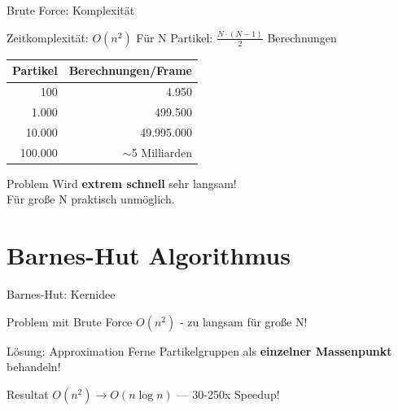 \documentclass[xcolor=dvipsnames]{beamer}
\begin{document}
\begin{frame}{Brute Force: Komplexität}
\begin{block}{Zeitkomplexität: $O(n^2)$}
Für N Partikel: $\frac{N \cdot (N-1)}{2}$ Berechnungen
\end{block}

\begin{table}
\centering
\begin{tabular}{r|r}
\textbf{Partikel} & \textbf{Berechnungen/Frame} \\ \hline
100 & 4.950 \\
1.000 & 499.500 \\
10.000 & 49.995.000 \\
100.000 & $\sim$5 Milliarden
\end{tabular}
\end{table}

\begin{alertblock}{Problem}
Wird \textbf{extrem schnell} sehr langsam! \\
Für große N praktisch unmöglich.
\end{alertblock}
\end{frame}

\section{Barnes-Hut Algorithmus}

\begin{frame}{Barnes-Hut: Kernidee}
\begin{block}{Problem mit Brute Force}
$O(n^2)$ - zu langsam für große N!
\end{block}

\begin{block}{Lösung: Approximation}
Ferne Partikelgruppen als \textbf{einzelner Massenpunkt} behandeln!
\end{block}

\begin{center}
\end{center}

\begin{exampleblock}{Resultat}
$O(n^2) \rightarrow O(n \log n)$ --- 30-250x Speedup!
\end{exampleblock}
\end{frame}
\end{document}
